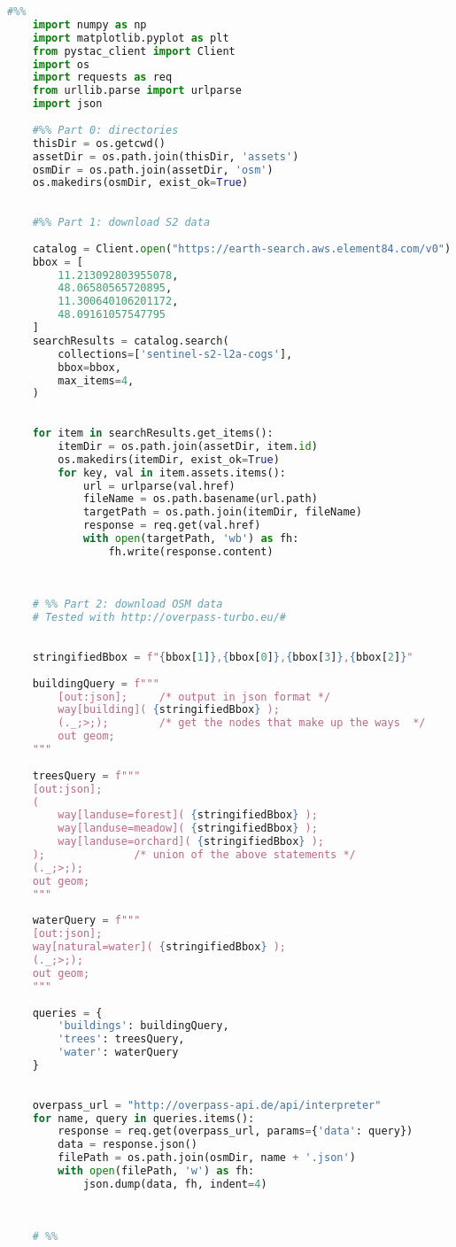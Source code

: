 \begin{lstlisting}[language=python]
    #%%
    import numpy as np
    import matplotlib.pyplot as plt
    from pystac_client import Client
    import os
    import requests as req
    from urllib.parse import urlparse
    import json
    
    #%% Part 0: directories
    thisDir = os.getcwd()
    assetDir = os.path.join(thisDir, 'assets')
    osmDir = os.path.join(assetDir, 'osm')
    os.makedirs(osmDir, exist_ok=True)
    
    
    #%% Part 1: download S2 data
    
    catalog = Client.open("https://earth-search.aws.element84.com/v0")
    bbox = [
        11.213092803955078,
        48.06580565720895,
        11.300640106201172,
        48.09161057547795
    ]
    searchResults = catalog.search(
        collections=['sentinel-s2-l2a-cogs'],
        bbox=bbox,
        max_items=4,
    )
    
    
    for item in searchResults.get_items():
        itemDir = os.path.join(assetDir, item.id)
        os.makedirs(itemDir, exist_ok=True)
        for key, val in item.assets.items():
            url = urlparse(val.href)
            fileName = os.path.basename(url.path)
            targetPath = os.path.join(itemDir, fileName)
            response = req.get(val.href)
            with open(targetPath, 'wb') as fh:
                fh.write(response.content)
    
    
    
    # %% Part 2: download OSM data
    # Tested with http://overpass-turbo.eu/#
    
    
    stringifiedBbox = f"{bbox[1]},{bbox[0]},{bbox[3]},{bbox[2]}"
    
    buildingQuery = f"""
        [out:json];     /* output in json format */
        way[building]( {stringifiedBbox} );
        (._;>;);        /* get the nodes that make up the ways  */
        out geom;
    """
    
    treesQuery = f"""
    [out:json];
    (
        way[landuse=forest]( {stringifiedBbox} );
        way[landuse=meadow]( {stringifiedBbox} );
        way[landuse=orchard]( {stringifiedBbox} );
    );              /* union of the above statements */
    (._;>;);
    out geom;
    """
    
    waterQuery = f"""
    [out:json];
    way[natural=water]( {stringifiedBbox} );
    (._;>;);
    out geom;
    """
    
    queries = {
        'buildings': buildingQuery,
        'trees': treesQuery,
        'water': waterQuery
    }
    
    
    overpass_url = "http://overpass-api.de/api/interpreter"
    for name, query in queries.items():
        response = req.get(overpass_url, params={'data': query})
        data = response.json()
        filePath = os.path.join(osmDir, name + '.json')
        with open(filePath, 'w') as fh:
            json.dump(data, fh, indent=4)
    
    
    
    # %%
    
\end{lstlisting}



